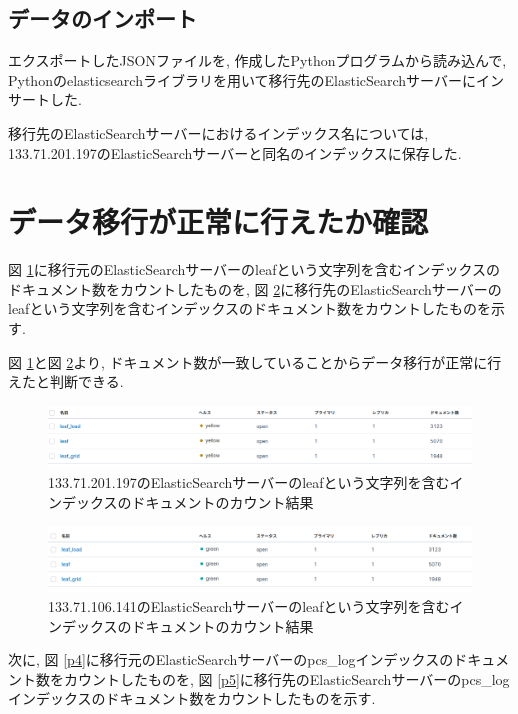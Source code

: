 \documentclass[a4j,12pt,]{jarticle}
\begin{document}
\subsection{データのインポート}
エクスポートしたJSONファイルを, 作成したPythonプログラムから読み込んで, Pythonのelasticsearchライブラリを用いて移行先のElasticSearchサーバーにインサートした.

移行先のElasticSearchサーバーにおけるインデックス名については, 133.71.201.197のElasticSearchサーバーと同名のインデックスに保存した.

\section{データ移行が正常に行えたか確認}
図 \ref{p2}に移行元のElasticSearchサーバーのleafという文字列を含むインデックスのドキュメント数をカウントしたものを, 図 \ref{p3}に移行先のElasticSearchサーバーのleafという文字列を含むインデックスのドキュメント数をカウントしたものを示す.

図 \ref{p2}と図 \ref{p3}より, ドキュメント数が一致していることからデータ移行が正常に行えたと判断できる.

\begin{figure}[H]
  \begin{center}
    \includegraphics[width=160mm]{197leaf.png}
    \caption{133.71.201.197のElasticSearchサーバーのleafという文字列を含むインデックスのドキュメントのカウント結果}
    \label{p2}
  \end{center}
\end{figure}

\begin{figure}[H]
  \begin{center}
    \includegraphics[width=160mm]{141leaf.png}
    \caption{133.71.106.141のElasticSearchサーバーのleafという文字列を含むインデックスのドキュメントのカウント結果}
    \label{p3}
  \end{center}
\end{figure}

次に, 図 \ref{p4}に移行元のElasticSearchサーバーのpcs\_logインデックスのドキュメント数をカウントしたものを, 図 \ref{p5}に移行先のElasticSearchサーバーのpcs\_logインデックスのドキュメント数をカウントしたものを示す.
\end{document}
